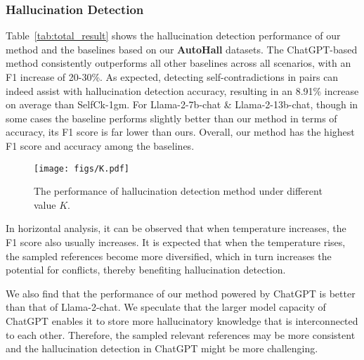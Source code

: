 \subsubsection{Hallucination Detection}



Table~\ref{tab:total_result} shows the hallucination detection performance of our method and the baselines based on our \textbf{AutoHall} datasets. The ChatGPT-based method consistently outperforms all other baselines across all scenarios, with an F1 increase of 20-30\%. As expected, detecting self-contradictions in pairs can indeed assist with hallucination detection accuracy, resulting in an 8.91\% increase on average than SelfCk-1gm. For Llama-2-7b-chat \& Llama-2-13b-chat, though in some cases the baseline performs slightly better than our method in terms of accuracy, its F1 score is far lower than ours. Overall, our method has the highest F1 score and accuracy among the baselines.


\begin{figure}[htbp]
    \centering
    \texttt{[image: figs/K.pdf]}
    \caption{The performance of hallucination detection method under different value $K$.}
    \label{fig:k_impact}
\end{figure}



In horizontal analysis, it can be observed that when temperature increases, the F1 score also usually increases. 
It is expected that when the temperature rises, the sampled references become more diversified, which in turn increases the potential for conflicts, thereby benefiting hallucination detection.

We also find that the performance of our method powered by ChatGPT is better than that of Llama-2-chat. We speculate that the larger model capacity of ChatGPT enables it to store more hallucinatory knowledge that is interconnected to each other. Therefore, the sampled relevant references may be more consistent and the hallucination detection in ChatGPT might be more challenging.





